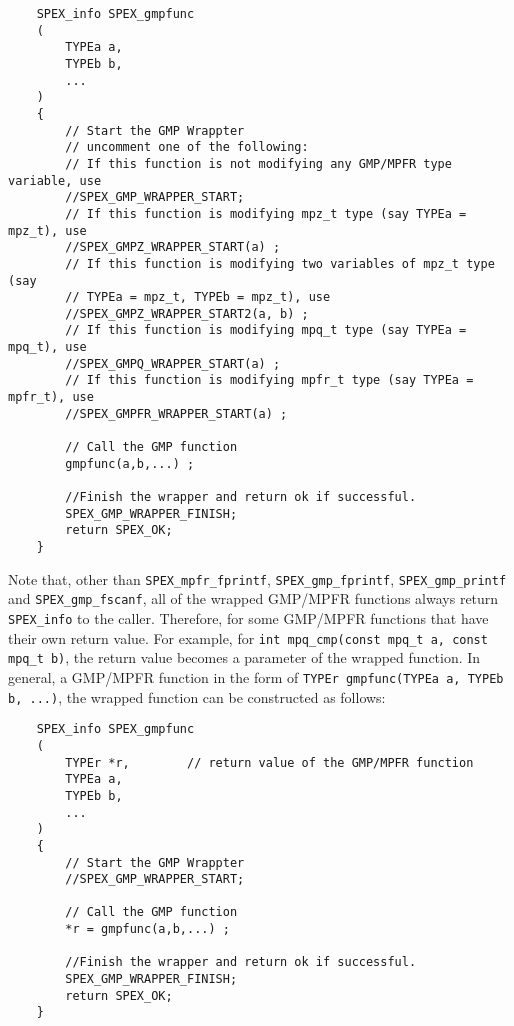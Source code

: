 \documentclass[12pt,oneside]{book}
\theoremstyle{definition}
\begin{document}
\begin{mdframed}[userdefinedwidth=\textwidth]
{\footnotesize
\begin{verbatim}
    SPEX_info SPEX_gmpfunc
    (
        TYPEa a,
        TYPEb b,
        ...
    )
    {
        // Start the GMP Wrappter
        // uncomment one of the following:
        // If this function is not modifying any GMP/MPFR type variable, use
        //SPEX_GMP_WRAPPER_START;
        // If this function is modifying mpz_t type (say TYPEa = mpz_t), use
        //SPEX_GMPZ_WRAPPER_START(a) ;
        // If this function is modifying two variables of mpz_t type (say
        // TYPEa = mpz_t, TYPEb = mpz_t), use
        //SPEX_GMPZ_WRAPPER_START2(a, b) ;
        // If this function is modifying mpq_t type (say TYPEa = mpq_t), use
        //SPEX_GMPQ_WRAPPER_START(a) ;
        // If this function is modifying mpfr_t type (say TYPEa = mpfr_t), use
        //SPEX_GMPFR_WRAPPER_START(a) ;
    
        // Call the GMP function
        gmpfunc(a,b,...) ;
    
        //Finish the wrapper and return ok if successful.
        SPEX_GMP_WRAPPER_FINISH;
        return SPEX_OK;
    }
\end{verbatim}
} \end{mdframed}

\newpage
Note that, other than \verb|SPEX_mpfr_fprintf|, \verb|SPEX_gmp_fprintf|,
\verb|SPEX_gmp_printf| and \verb|SPEX_gmp_fscanf|, all of the wrapped GMP/MPFR
functions always return \verb|SPEX_info| to the caller. Therefore, for some
GMP/MPFR functions that have their own return value.  For example, for
\verb|int mpq_cmp(const mpq_t a, const mpq_t b)|, the return value becomes a
parameter of the wrapped function. In general, a GMP/MPFR function in the form
of \verb|TYPEr gmpfunc(TYPEa a, TYPEb b, ...)|, the wrapped
function can be constructed as follows:

\begin{mdframed}[userdefinedwidth=\textwidth]
{\footnotesize
\begin{verbatim}
    SPEX_info SPEX_gmpfunc
    (
        TYPEr *r,        // return value of the GMP/MPFR function
        TYPEa a,
        TYPEb b,
        ...
    )
    {
        // Start the GMP Wrappter
        //SPEX_GMP_WRAPPER_START;
    
        // Call the GMP function
        *r = gmpfunc(a,b,...) ;
    
        //Finish the wrapper and return ok if successful.
        SPEX_GMP_WRAPPER_FINISH;
        return SPEX_OK;
    }
\end{verbatim}
} \end{mdframed}
\end{document}
